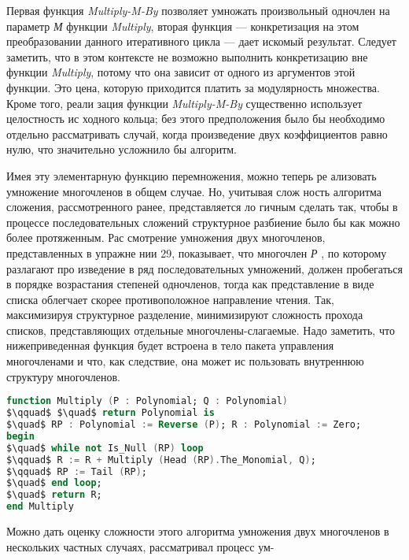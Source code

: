 \par Первая функция {\it Multiply-M-By} позволяет умножать произвольный
одночлен на параметр {\it М} функции {\it Multiply}, вторая функция — 
конкретизация на этом преобразовании данного итеративного цикла —
дает искомый результат. Следует заметить, что в этом контексте не­
возможно выполнить конкретизацию вне функции {\it Multiply}, потому что
она зависит от одного из аргументов этой функции. Это цена, которую
приходится платить за модулярность множества. Кроме того, реали­
зация функции {\it Multiply-M-By} существенно использует целостность ис­
ходного кольца; без этого предположения было бы необходимо отдельно
рассматривать случай, когда произведение двух коэффициентов равно
нулю, что значительно усложнило бы алгоритм.
\par Имея эту элементарную функцию перемножения, можно теперь ре­
ализовать умножение многочленов в общем случае. Но, учитывая слож­
ность алгоритма сложения, рассмотренного ранее, представляется ло­
гичным сделать так, чтобы в процессе последовательных сложений
структурное разбиение было бы как можно более протяженным. Рас­
смотрение умножения двух многочленов, представленных в упражне­
нии 29, показывает, что многочлен {\it Р} , по которому разлагают про­
изведение в ряд последовательных умножений, должен пробегаться в
порядке возрастания степеней одночленов, тогда как представление в
виде списка облегчает скорее противоположное направление чтения.
Так, максимизируя структурное разделение, минимизируют сложность
прохода списков, представляющих отдельные многочлены-слагаемые.
Надо заметить, что нижеприведенная функция будет встроена в тело
пакета управления многочленами и что, как следствие, она может ис­
пользовать внутреннюю структуру многочленов.

\begin{lstlisting}[mathescape=true, language=Ada, basicstyle=\small]
function Multiply (P : Polynomial; Q : Polynomial)
$\qquad$ $\quad$ return Polynomial is
$\quad$ RP : Polynomial := Reverse (P); R : Polynomial := Zero;
begin
$\quad$ while not Is_Null (RP) loop
$\qquad$ R := R + Multiply (Head (RP).The_Monomial, Q);
$\qquad$ RP := Tail (RP);
$\quad$ end loop;
$\quad$ return R;
end Multiply
\end{lstlisting}

\par Можно дать оценку сложности этого алгоритма умножения двух
многочленов в нескольких частных случаях, рассматривал процесс ум-
\newpage

